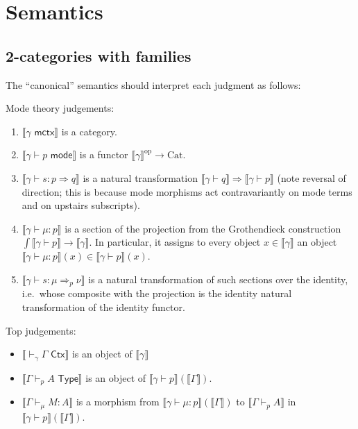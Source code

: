 \documentclass[10pt]{article}
\theoremstyle{definition}
\newcommand{\yields}{\vdash}
\newcommand{\tcell}{\Rightarrow}
\newcommand{\CTX}{\,\,\mathsf{Ctx}}
\newcommand{\ctx}{\,\,\mathsf{mctx}}
\newcommand{\TYPE}{\,\,\mathsf{Type}}
\newcommand{\type}{\,\,\mathsf{mode}}
\newcommand\TypeTwo[4]{\ensuremath{#1 \vdash #2 :  #3 \tcell #4}}
\newcommand\TermTwoT[5]{\ensuremath{#1 \vdash {#2} : #3 \tcell_{#5} #4}}
\newcommand\mm[1]{\llbracket #1 \rrbracket}
\newcommand\op{^{\mathrm{op}}}
\newcommand\Cat{\mathrm{Cat}}
\begin{document}
\section{Semantics}
\label{sec:semantics}

\subsection{2-categories with families}
\label{sec:2cwfs}

The ``canonical'' semantics should interpret each judgment as follows:

Mode theory judgements:
\begin{enumerate}
\item $\mm{\gamma \ctx}$ is a category.
\item $\mm{\gamma \yields p \type}$ is a functor $\mm{\gamma}\op \to \Cat$.
\item $\mm{\TypeTwo{\gamma}{s}{p}{q}}$ is a natural transformation $\mm{\gamma \yields q} \Rightarrow \mm{\gamma \yields p}$ (note reversal of direction; this is because mode morphisms act contravariantly on mode terms and on upstairs subscripts).
\item $\mm{\gamma \yields \mu : p}$ is a section of the projection from the Grothendieck construction $\int\mm{\gamma\yields p} \to \mm{\gamma}$.
  In particular, it assigns to every object $x\in \mm{\gamma}$ an object $\mm{\gamma \yields \mu : p}(x)\in \mm{\gamma\yields p}(x)$.
\item $\mm{\TermTwoT{\gamma}{s}{\mu}{\nu}{p}}$ is a natural transformation of such sections over the identity, i.e.\ whose composite with the projection is the identity natural transformation of the identity functor.
\end{enumerate}

Top judgements: 
\begin{itemize}
\item $\mm{\yields_\gamma \Gamma \CTX}$ is an object of $\mm{\gamma}$
\item $\mm{\Gamma \yields_p A \TYPE}$ is an object of $\mm{\gamma \yields p}(\mm{\Gamma})$.
\item $\mm{\Gamma \yields_\mu M : A}$ is a morphism from $\mm{\gamma \yields \mu : p}(\mm{\Gamma})$ to $\mm{\Gamma \yields_p A}$ in $\mm{\gamma \yields p}(\mm{\Gamma})$.
\end{itemize}
\end{document}
